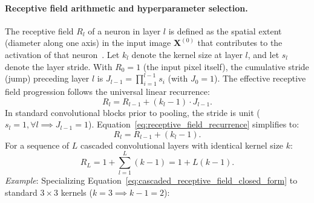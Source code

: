 \paragraph{Receptive field arithmetic and hyperparameter selection.}
The receptive field $R_l$ of a neuron in layer $l$ is defined as the spatial extent (diameter along one axis) in the input image $\mathbf{X}^{(0)}$ that contributes to the activation of that neuron~\cite{bishop2024deep,prince2023understanding}. Let $k_l$ denote the kernel size at layer $l$, and let $s_l$ denote the layer stride. With $R_0 = 1$ (the input pixel itself), the cumulative stride (jump) preceding layer $l$ is $J_{l-1} = \prod_{i=1}^{l-1} s_i$ (with $J_0 = 1$). The effective receptive field progression follows the universal linear recurrence:
\begin{equation}
R_l = R_{l-1} + (k_l - 1) \cdot J_{l-1}.
\label{eq:receptive_field_recurrence}
\end{equation}
In standard convolutional blocks prior to pooling, the stride is unit ($s_l = 1, \forall l \implies J_{l-1} = 1$). Equation~\eqref{eq:receptive_field_recurrence} simplifies to:
\begin{equation}
R_l = R_{l-1} + (k_l - 1).
\label{eq:unit_stride_receptive_field}
\end{equation}
For a sequence of $L$ cascaded convolutional layers with identical kernel size $k$:
\begin{equation}
R_L = 1 + \sum_{l=1}^L (k - 1) = 1 + L(k - 1).
\label{eq:cascaded_receptive_field_closed_form}
\end{equation}
\textit{Example}: Specializing Equation~\eqref{eq:cascaded_receptive_field_closed_form} to standard $3 \times 3$ kernels ($k = 3 \implies k - 1 = 2$):
